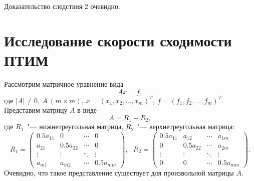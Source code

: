 \documentclass[11pt,a4paper,twoside]{report}
\numberwithin{equation}{section}
\theoremstyle{definition}
\theoremstyle{plain}
\begin{document}
Доказательство следствия 2 очевидно.
%
\section{Исследование скорости сходимости {\scshape ПТИМ}}
%
Рассмотрим матричное уравнение вида
%
\begin{equation}
    \label{eq:linear-system5}
    Ax = f,
\end{equation}
%
где
$
|A| \ne 0, ~A~(m \times m),~
x = (x_1, x_2, \ldots, x_m)^T,~
f = (f_1, f_2, \ldots, f_m)^T
$.
\\
Представим матрицу $A$ в виде
%
$$
    A = R_1 + R_2,
$$
%
где $R_1$~"--- нижнетреугольная матрица, $R_2$~"--- верхнетреугольная матрица:
%
$$
    R_1 =
    \begin{pmatrix}
        0.5a_{11}& 0        & \cdots & 0  \\
        a_{21}   & 0.5a_{22}& \cdots & 0  \\
        \vdots   & \vdots   & \ddots & \vdots  \\
        a_{m1}   & a_{m2}   & \cdots & 0.5a_{mm}
    \end{pmatrix}
    ,
    ~~~R_2 =
    \begin{pmatrix}
        0.5a_{11}& a_{12}   & \cdots & a_{1m} \\
        0        & 0.5a_{22}& \cdots & a_{2m} \\
        \vdots   & \vdots   & \ddots & \vdots \\
        0        & 0        & \cdots & 0.5a_{mm}
    \end{pmatrix}
    .
$$
%
Очевидно, что такое представление существует для произвольной матрицы $A$.
\end{document}
